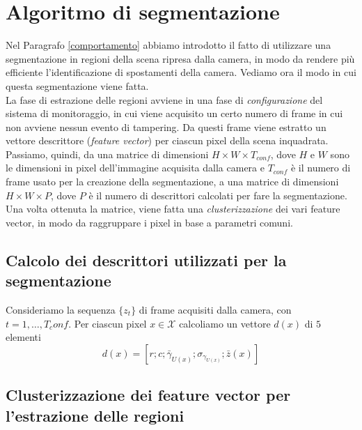 \section{Algoritmo di segmentazione}
\label{segmentazione}
Nel Paragrafo \ref{comportamento} abbiamo introdotto il fatto di utilizzare una segmentazione in regioni della scena ripresa dalla camera, in modo da rendere pi\`u efficiente l'identificazione di spostamenti della camera.
Vediamo ora il modo in cui questa segmentazione viene fatta.\\
La fase di estrazione delle regioni avviene in una fase di \textit{configurazione} del sistema di monitoraggio, in cui viene acquisito un certo numero di frame in cui non avviene nessun evento di tampering.
Da questi frame viene estratto un vettore descrittore (\textit{feature vector}) per ciascun pixel della scena inquadrata.
Passiamo, quindi, da una matrice di dimensioni $H\times W \times T_{conf}$, dove $H$ e $W$ sono le dimensioni in pixel dell'immagine acquisita dalla camera e $T_{conf}$ \`e il numero di frame usato per la creazione della segmentazione, a una matrice di dimensioni $H\times W \times P$, dove $P$ \`e il numero di descrittori calcolati per fare la segmentazione.\\
Una volta ottenuta la matrice, viene fatta una \textit{clusterizzazione} dei vari feature vector, in modo da raggruppare i pixel in base a parametri comuni.
\subsection{Calcolo dei descrittori utilizzati per la segmentazione}
Consideriamo la sequenza $\{z_t\}$ di frame acquisiti dalla camera, con $t=1,\dots,T_conf$.
Per ciascun pixel $x\in\mathcal{X}$ calcoliamo un vettore $d(x)$ di $5$ elementi
\begin{equation}
	\label{eq:featureVector}
	d(x)=\left[r;c;\bar{\gamma}_{U(x)};\sigma_{\gamma_{U(x)}};\bar{z}(x)\right]
\end{equation}
\subsection{Clusterizzazione dei feature vector per l'estrazione delle regioni}